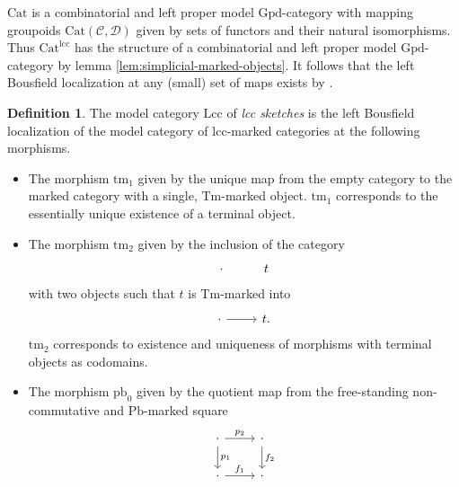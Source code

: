 \documentclass[a4paper]{article}
\theoremstyle{remark}
\theoremstyle{definition}
\newtheorem{definition}[theorem]{Definition}
\begin{document}
$\mathrm{Cat}$ is a combinatorial and left proper model $\mathrm{Gpd}$-category with mapping groupoids $\mathrm{Cat}(\mathcal{C}, \mathcal{D})$ given by sets of functors and their natural isomorphisms.
Thus $\mathrm{Cat}^{\mathrm{lcc}}$ has the structure of a combinatorial and left proper model $\mathrm{Gpd}$-category by lemma \ref{lem:simplicial-marked-objects}.
It follows that the left Bousfield localization at any (small) set of maps exists by \cite[Theorem 4.1.1]{hirschhorn}.

\begin{definition}
  \label{def:lcc-axioms}
  The model category $\mathrm{Lcc}$ of \emph{lcc sketches} is the left Bousfield localization of the model category of $\mathrm{lcc}$-marked categories at the following morphisms.
  \begin{itemize}
    \item
      The morphism $\mathrm{tm}_1$ given by the unique map from the empty category to the marked category with a single, $\mathrm{Tm}$-marked object.
      $\mathrm{tm}_1$ corresponds to the essentially unique existence of a terminal object.
    \item
      The morphism $\mathrm{tm}_2$ given by the inclusion of the category
      \begin{equation}
        \begin{tikzcd}
          \cdot & t
        \end{tikzcd}
      \end{equation}
      with two objects such that $t$ is $\mathrm{Tm}$-marked into
      \begin{equation}
          \begin{tikzcd}
            \cdot \arrow[r] & t.
          \end{tikzcd}
      \end{equation}
      $\mathrm{tm}_2$ corresponds to existence and uniqueness of morphisms with terminal objects as codomains.
    \item
      \label{itm:pbs-commute}
      The morphism $\mathrm{pb}_0$ given by the quotient map from the free-standing non-commutative and $\mathrm{Pb}$-marked square
      \begin{equation}
        \begin{tikzcd}
          \cdot \arrow[r, "p_2"] \arrow[d, "p_1"] & \cdot \arrow[d, "f_2"] \\
          \cdot \arrow[r, "f_1"] & \cdot
        \end{tikzcd}
      \end{equation}

\end{itemize}
\end{definition}
\end{document}
